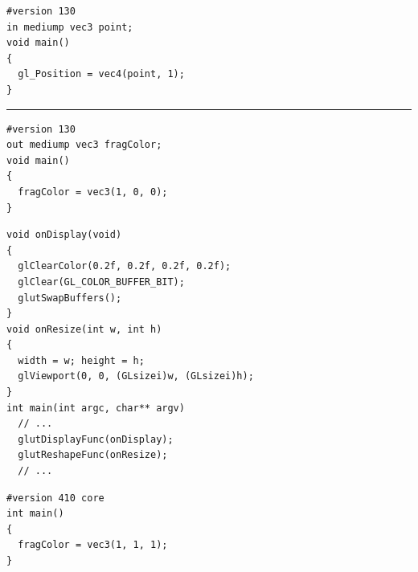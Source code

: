 \documentclass[calcdimensions,landscape,letterpaper]{powersem}
\newcommand{\thecurrentheading}{}
\newcommand{\heading}[1]{\renewcommand{\thecurrentheading}{#1}}
\begin{document}
\begin{slide}
    \heading{Minimal Shaders}
    \begin{center}
        \begin{minipage}[c]{.5\textwidth}
            \begin{verbatim}
#version 130
in mediump vec3 point;
void main()
{
  gl_Position = vec4(point, 1);
}
            \end{verbatim}
            \rule{4cm}{0.4pt}
            \begin{verbatim}
#version 130
out mediump vec3 fragColor;
void main()
{
  fragColor = vec3(1, 0, 0);
}
            \end{verbatim}
        \end{minipage}
    \end{center}
\end{slide}

\begin{slide}
    \heading{GLUT Display Callbacks}
    \begin{center}
        \begin{minipage}[c]{.7\textwidth}
            \begin{verbatim}
void onDisplay(void)
{
  glClearColor(0.2f, 0.2f, 0.2f, 0.2f);
  glClear(GL_COLOR_BUFFER_BIT);
  glutSwapBuffers();
}
void onResize(int w, int h)
{
  width = w; height = h;
  glViewport(0, 0, (GLsizei)w, (GLsizei)h);
}
int main(int argc, char** argv)
  // ...
  glutDisplayFunc(onDisplay);
  glutReshapeFunc(onResize);
  // ...
            \end{verbatim}
        \end{minipage}
    \end{center}
\end{slide}


\begin{slide}
  \heading{GLSL}
  \begin{center}
    \begin{verbatim}
#version 410 core
int main()
{
  fragColor = vec3(1, 1, 1);
}
    \end{verbatim}
  \end{center}
\end{slide}
\end{document}
